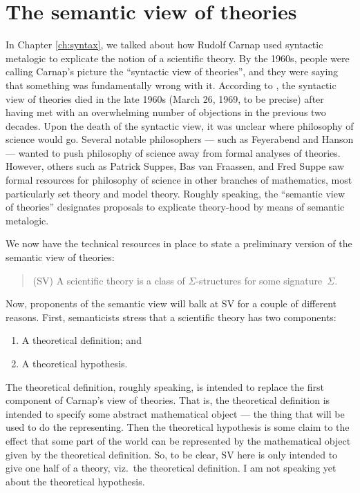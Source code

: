 \section{The semantic view of theories}

In Chapter \ref{ch:syntax}, we talked about how Rudolf Carnap used
syntactic metalogic to explicate the notion of a scientific theory.
By the 1960s, people were calling Carnap's picture the ``syntactic
view of theories'', and they were saying that something was
fundamentally wrong with it.  According to \cite{suppe2000}, the
syntactic view of theories died in the late 1960s (March 26, 1969, to
be precise) after having met with an overwhelming number of objections
in the previous two decades.  Upon the death of the syntactic view, it
was unclear where philosophy of science would go.  Several notable
philosophers --- such as Feyerabend and Hanson --- wanted to push
philosophy of science away from formal analyses of theories.  However,
others such as Patrick Suppes, Bas van Fraassen, and Fred Suppe saw
formal resources for philosophy of science in other branches of
mathematics, most particularly set theory and model theory.  Roughly
speaking, the ``semantic view of theories'' designates proposals to
explicate theory-hood by means of semantic metalogic.

We now have the technical resources in place to state a preliminary
version of the semantic view of theories:
\begin{quote}
  (SV) A scientific theory is a class of $\Sigma$-structures for some
  signature~$\Sigma$.
\end{quote}
Now, proponents of the semantic view will balk at SV for a couple of
different reasons.  First, semanticists stress that a scientific
theory has two components:
\begin{enumerate}
\item A theoretical definition; and
\item A theoretical hypothesis.
\end{enumerate} 
The theoretical definition, roughly speaking, is intended to replace
the first component of Carnap's view of theories.  That is, the
theoretical definition is intended to specify some abstract
mathematical object --- the thing that will be used to do the
representing.  Then the theoretical hypothesis is some claim to the
effect that some part of the world can be represented by the
mathematical object given by the theoretical definition.  So, to be
clear, SV here is only intended to give one half of a theory, viz.\
the theoretical definition.  I am not speaking yet about the
theoretical hypothesis.


